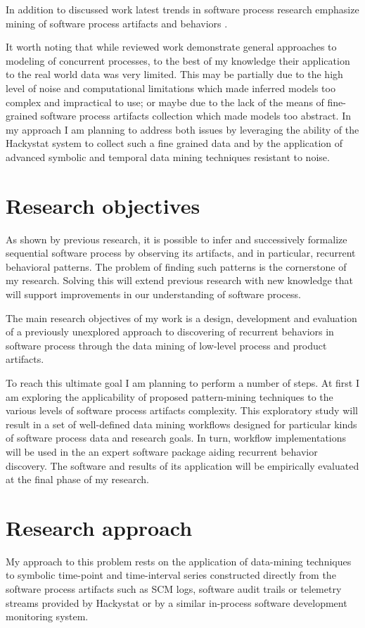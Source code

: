 \documentclass{sig-alternate}
\begin{document}
In addition to discussed work latest trends in software process research emphasize mining of software process artifacts and behaviors \cite{citeulike:2678511} \cite{citeulike:5043664} \cite{citeulike:5112229}. 

It worth noting that while reviewed work demonstrate general approaches to modeling of concurrent processes, to the best of my knowledge their application to the real world data was very limited. This may be partially due to the high level of noise and computational limitations which made inferred models too complex and impractical to use; or maybe due to the lack of the means of fine-grained software process artifacts collection which made models too abstract. In my approach I am planning to address both issues by leveraging the ability of the Hackystat system \cite{citeulike:4041809} to collect such a fine grained data and by the application of advanced symbolic and temporal data mining techniques resistant to noise.

\section{Research objectives}
As shown by previous research, it is possible to infer and successively formalize sequential software process by observing its artifacts, and in particular, recurrent behavioral patterns. The problem of finding such patterns is the cornerstone of my research. Solving this will extend previous research with new knowledge that will support improvements in our understanding of software process.

The main research objectives of my work is a design, development and evaluation of a previously unexplored approach to discovering of recurrent behaviors in software process through the data mining of low-level process and product artifacts. 

To reach this ultimate goal I am planning to perform a number of steps. At first I am exploring the applicability of proposed pattern-mining techniques to the various levels of software process artifacts complexity. This exploratory study will result in a set of well-defined data mining workflows designed for particular kinds of software process data and research goals. In turn, workflow implementations will be used in the an expert software package aiding recurrent behavior discovery. The software and results of its application will be empirically evaluated at the final phase of my research.

\section{Research approach}
My approach to this problem rests on the application of data-mining techniques to symbolic time-point and time-interval series constructed directly from the software process artifacts such as SCM logs, software audit trails or telemetry streams provided by Hackystat or by a similar in-process software development monitoring system.
\end{document}
